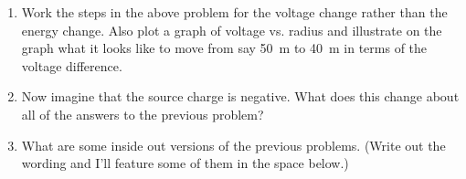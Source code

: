 \begin{enumerate}
\begin{enumerate}
   \item How much energy would it take to move a \SI{1}{\micro C} charge from infinitely far away to a position of \SI{100}{\meter} away?
   \item How much energy would it take to move a \SI{1}{\micro C} charge from infinitely far away to a position of \SI{90}{\meter} away?
   \item How much energy would it take to move a \SI{1}{\micro C} charge from a position \SI{100}{\meter} away to a position of \SI{90}{\meter} away?
   \item To move \SI{10}{\meter} closer, how much more energy would it take?
   \item How much energy would it take for each \SI{10}{\meter} displacement closer to the fixed charge?
\end{enumerate}

\item
Work the steps in the above problem for the voltage change rather than the energy change. Also plot a graph of voltage vs. radius and illustrate on the graph what it looks like to move from say \SI{50}{\meter} to \SI{40}{\meter} in terms of the voltage difference.\newpage

\item 
Now imagine that the source charge is negative. What does this change about all of the answers to the previous problem?\giantskip

\item
What are some inside out versions of the previous problems. (Write out the wording and I'll feature some of them in the space below.)


\end{enumerate}
